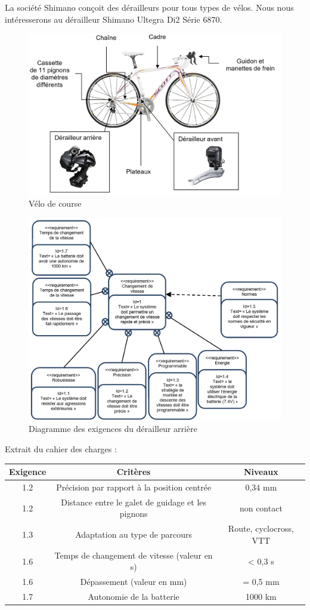 La société Shimano conçoit des dérailleurs pour tous types de vélos. Nous nous intéresserons au dérailleur Shimano Ultegra Di2 Série 6870.

\begin{figure}[!h]
 \centering\includegraphics[width=0.7\linewidth]{img/img01}
 \caption{Vélo de course}
 \label{img01}
\end{figure}

\begin{figure}[!h]
 \centering\includegraphics[width=0.8\linewidth]{img/img02}
 \caption{Diagramme des exigences du dérailleur arrière}
 \label{img02}
\end{figure}

\newpage

Extrait du cahier des charges :
\begin{center}
\begin{tabular}{|c|c|c|}
\hline
Exigence & Critères & Niveaux \\
\hline
1.2	& Précision par rapport à la position centrée & 0,34 mm \\
\hline
1.2	& Distance entre le galet de guidage et les pignons & non contact \\
\hline
1.3	& Adaptation au type de parcours & Route, cyclocross, VTT \\
\hline
1.6	& Temps de changement de vitesse (valeur en s) & < 0,3 s \\
\hline
1.6	& Dépassement (valeur en mm) & = 0,5 mm \\
\hline
1.7 & Autonomie de la batterie & 1000 km \\
\hline
\end{tabular}
\end{center}

